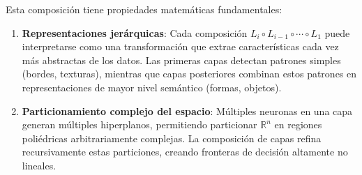 Esta composición tiene propiedades matemáticas fundamentales:
\begin{enumerate}
    \item \textbf{Representaciones jerárquicas}: Cada composición $L_i \circ L_{i-1} \circ \cdots \circ L_1$ puede interpretarse como una transformación que extrae características cada vez más abstractas de los datos. Las primeras capas detectan patrones simples (bordes, texturas), mientras que capas posteriores combinan estos patrones en representaciones de mayor nivel semántico (formas, objetos).

    \item \textbf{Particionamiento complejo del espacio}: Múltiples neuronas en una capa generan múltiples hiperplanos, permitiendo particionar $\mathbb{R}^n$ en regiones poliédricas arbitrariamente complejas. La composición de capas refina recursivamente estas particiones, creando fronteras de decisión altamente no lineales.
\end{enumerate}

